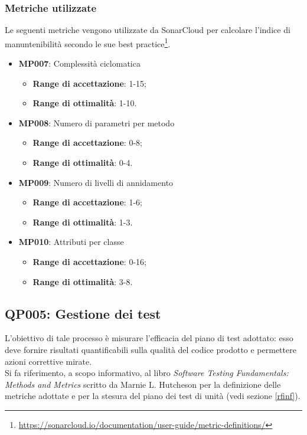 \subsubsection{Metriche utilizzate}
Le seguenti metriche vengono utilizzate da SonarCloud per calcolare l'indice di manuntenibilità secondo le sue best practice\footnote{\url{https://sonarcloud.io/documentation/user-guide/metric-definitions/}}.
\begin{itemize}
	\item \textbf{MP007}: Complessità ciclomatica
	\begin{itemize}
		\item \textbf{Range di accettazione}: 1-15;
		\item \textbf{Range di ottimalità}: 1-10.
	\end{itemize}
	\item \textbf{MP008}: Numero di parametri per metodo
	\begin{itemize}
		\item \textbf{Range di accettazione}: 0-8;
		\item \textbf{Range di ottimalità}: 0-4.
	\end{itemize}
	\item \textbf{MP009}: Numero di livelli di annidamento
	\begin{itemize}
		\item \textbf{Range di accettazione}: 1-6;
		\item \textbf{Range di ottimalità}: 1-3.
	\end{itemize}
	\item \textbf{MP010}: Attributi per classe
	\begin{itemize}
		\item \textbf{Range di accettazione}: 0-16;
		\item \textbf{Range di ottimalità}: 3-8.
	\end{itemize}
		
\end{itemize}

\subsection{QP005: Gestione dei test}\label{test}\label{pro5}
L'obiettivo di tale processo è misurare l'efficacia del piano di test adottato: esso deve fornire risultati quantificabili sulla qualità del codice prodotto e permettere azioni correttive mirate.\\
Si fa riferimento, a scopo informativo, al libro \textit{Software Testing Fundamentals: Methods and Metrics} scritto da Marnie L. Hutcheson per la definizione delle metriche adottate e per la stesura del piano dei test di unità (vedi sezione \ref{rfinf}).
